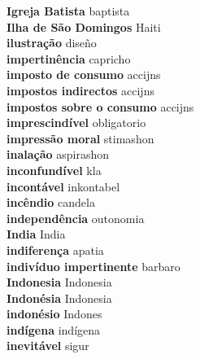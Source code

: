 \textbf{ Igreja Batista  } baptista \\
\textbf{ Ilha de São Domingos  } Haiti \\
\textbf{ ilustração  } diseño \\
\textbf{ impertinência  } capricho \\
\textbf{ imposto de consumo  } accijns \\
\textbf{ impostos indirectos  } accijns \\
\textbf{ impostos sobre o consumo  } accijns \\
\textbf{ imprescindível  } obligatorio \\
\textbf{ impressão moral  } stimashon \\
\textbf{ inalação  } aspirashon \\
\textbf{ inconfundível  } kla \\
\textbf{ incontável  } inkontabel \\
\textbf{ incêndio  } candela \\
\textbf{ independência  } outonomia \\
\textbf{ India  } India \\
\textbf{ indiferença  } apatia \\
\textbf{ indivíduo impertinente  } barbaro \\
\textbf{ Indonesia  } Indonesia \\
\textbf{ Indonésia  } Indonesia \\
\textbf{ indonésio  } Indones \\
\textbf{ indígena  } indígena \\
\textbf{ inevitável  } sigur \\
